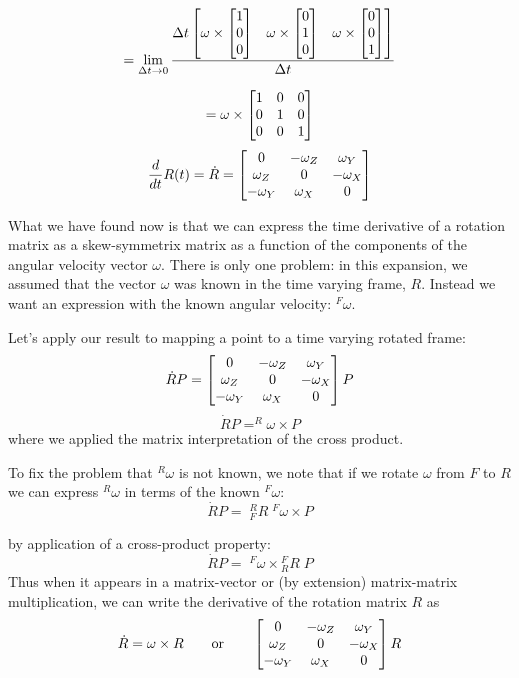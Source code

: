 \[
 = \lim_{\Delta t \to 0} \frac{
     \Delta t
     \begin{bmatrix}
         \omega\times \begin{bmatrix} 1\\0\\0 \end{bmatrix} & \omega\times\begin{bmatrix} 0\\1\\0 \end{bmatrix} &  \omega\times\begin{bmatrix} 0\\0\\1\end{bmatrix}
     \end{bmatrix}
   }{\Delta t}
\]

\[
         = \omega \times \begin{bmatrix}    1&0&0\\
                                  0&1&0\\
                                  0&0&1 \end{bmatrix}
\]
\[
\frac{d}{dt} R(t) = \dot{R} =
             \begin{bmatrix}       0   & -\omega_Z & \omega_Y   \\
                    \omega_Z &     0     & -\omega_X  \\
                   -\omega_Y & \omega_X  &    0       \end{bmatrix}
\]


What we have found now is that we can express the time derivative of a rotation matrix as a skew-symmetrix matrix as a function of the components of the angular velocity vector $\omega$.
There is only one problem: in this expansion, we assumed that the vector $\omega$ was known in the time varying frame, $R$.  Instead we want an expression with the known angular velocity: $^F\omega$.

Let's apply our result to mapping a point to a time varying rotated frame:
\[
 \dot{R}P =
             \begin{bmatrix}       0   & -\omega_Z & \omega_Y   \\
                    \omega_Z &     0     & -\omega_X  \\
                   -\omega_Y & \omega_X  &    0       \end{bmatrix}  P
\]
\[
\dot{R}P = ^R\omega\times P
\]
where we applied the matrix interpretation of the cross product.

To fix the problem that $^R\omega$ is not known, we note that if we rotate $\omega$ from $F$ to $R$ we can express $^R\omega$ in terms of the known $^F\omega$:
\[
\dot{R}P = \;{^R_FR}\; ^F\omega\times P
\]

by application of a cross-product property:
\[
\dot{R}P = \; ^F\omega\times {^F_RR}\; P
\]
Thus when it appears in a matrix-vector or (by extension) matrix-matrix multiplication, we can write the derivative of the rotation matrix $R$ as
\[
\dot{R} = \omega \times R \qquad \mathrm{or} \qquad \begin{bmatrix}       0   & -\omega_Z & \omega_Y   \\
                  \omega_Z &     0     & -\omega_X  \\
                 -\omega_Y & \omega_X  &    0       \end{bmatrix} R
\]





